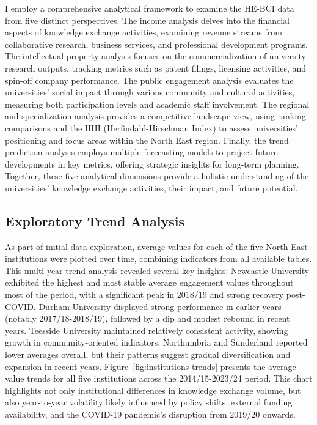 \documentclass[journal,onecolumn, 10pt,draftclsnofoot]{IEEEtran}
\begin{document}
I employ a comprehensive analytical framework to examine the HE-BCI data from five distinct perspectives. The income analysis delves into the financial aspects of knowledge exchange activities, examining revenue streams from collaborative research, business services, and professional development programs. The intellectual property analysis focuses on the commercialization of university research outputs, tracking metrics such as patent filings, licensing activities, and spin-off company performance. The public engagement analysis evaluates the universities' social impact through various community and cultural activities, measuring both participation levels and academic staff involvement. The regional and specialization analysis provides a competitive landscape view, using ranking comparisons and the HHI (Herfindahl-Hirschman Index) to assess universities' positioning and focus areas within the North East region. Finally, the trend prediction analysis employs multiple forecasting models to project future developments in key metrics, offering strategic insights for long-term planning. Together, these five analytical dimensions provide a holistic understanding of the universities' knowledge exchange activities, their impact, and future potential.

\subsection{Exploratory Trend Analysis}

As part of initial data exploration, average values for each of the five North East institutions were plotted over time, combining indicators from all available tables. This multi-year trend analysis revealed several key insights: Newcastle University exhibited the highest and most stable average engagement values throughout most of the period, with a significant peak in 2018/19 and strong recovery post-COVID. Durham University displayed strong performance in earlier years (notably 2017/18-2018/19), followed by a dip and modest rebound in recent years. Teesside University maintained relatively consistent activity, showing growth in community-oriented indicators. Northumbria and Sunderland reported lower averages overall, but their patterns suggest gradual diversification and expansion in recent years. Figure~\ref{fig:institutions-trends} presents the average value trends for all five institutions across the 2014/15-2023/24 period. This chart highlights not only institutional differences in knowledge exchange volume, but also year-to-year volatility likely influenced by policy shifts, external funding availability, and the COVID-19 pandemic's disruption from 2019/20 onwards.
\end{document}
